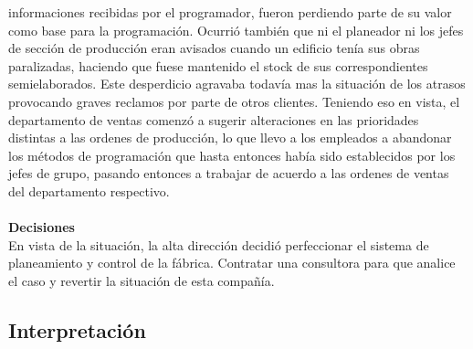 \documentclass[a4paper,10pt,titlepage]{article}
\begin{document}
informaciones recibidas por el programador, fueron perdiendo parte de su valor como
base para la programaci\'on. Ocurri\'o tambi\'en que ni el planeador ni los jefes de secci\'on
de producci\'on eran avisados cuando un edificio ten\'ia sus obras paralizadas, haciendo
que fuese mantenido el stock de sus correspondientes semielaborados. Este
desperdicio agravaba todav\'ia mas la situaci\'on de los atrasos provocando graves
reclamos por parte de otros clientes. Teniendo eso en vista, el departamento de ventas
comenz\'o a sugerir alteraciones en las prioridades distintas a las ordenes de
producci\'on, lo que llevo a los empleados a abandonar los m\'etodos de programaci\'on
que hasta entonces hab\'ia sido establecidos por los jefes de grupo, pasando entonces a
trabajar de acuerdo a las ordenes de ventas del departamento respectivo.\\ \\
\textbf{Decisiones}\\
En vista de la situaci\'on, la alta direcci\'on decidi\'o perfeccionar el sistema de
planeamiento y control de la f\'abrica.
Contratar una consultora para que analice el caso y revertir la situaci\'on de esta compa\~n\'ia.



\newpage
\subsection{Interpretaci\'on}
\end{document}
